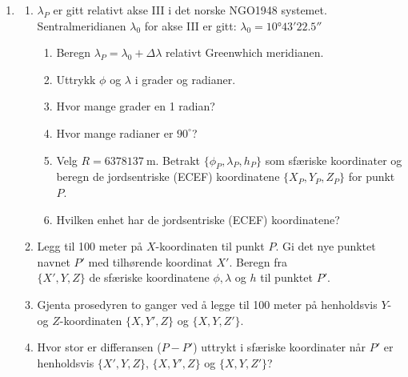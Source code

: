 \documentclass[a4paper, norsk, 11pt, twoside]{article}
\begin{document}
\begin{enumerate}
\item 
  \begin{enumerate}
  \item $\lambda_{P}$ er gitt relativt akse III i det norske NGO1948 systemet. Sentralmeridianen $\lambda_{0}$ for akse III er gitt: $\lambda_{0}=\ang{10;43;22.5}$
    \begin{enumerate}
    \item Beregn $\lambda_{P}= \lambda_{0} + \Delta\lambda$ relativt Greenwhich meridianen.
    \item Uttrykk $\phi$ og $\lambda$ i grader og radianer.
    \item Hvor mange grader en 1 radian?
    \item Hvor mange radianer er $90^{\circ}$?
    \item Velg $R = \SI{6378137}{\meter}$. Betrakt $\{\phi_{P},\lambda_{P},h_{P}\}$ som sfæriske koordinater og beregn de jordsentriske (ECEF) koordinatene $\{X_{P},Y_{P},Z_{P}\}$ for punkt $P$.
    \item Hvilken enhet har de jordsentriske (ECEF) koordinatene?
    \end{enumerate} 
  \item Legg til 100 meter på $X$-koordinaten til punkt $P$. Gi det nye punktet navnet $P'$ med tilhørende koordinat $X'$. Beregn fra \\ $\{ X',Y,Z \}$ de sfæriske koordinatene $\phi, \lambda$ og $h$ til punktet $P'$.
  \item Gjenta prosedyren to ganger ved å legge til 100 meter på henholdsvis $Y$- og $Z$-koordinaten $\{X,Y',Z\}$ og $\{X,Y,Z'\}$.
  \item Hvor stor er differansen ($P-P'$) uttrykt i sfæriske koordinater når $P'$ er henholdsvis $\{X',Y,Z\}$, $\{X,Y',Z\}$ og $\{X,Y,Z'\}$?
  \end{enumerate}

\newpage


\end{enumerate}
\end{document}
